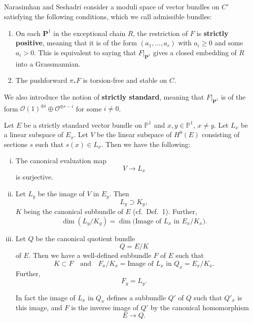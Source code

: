 \documentclass[12pt]{article}
\begin{document}
\subsection{}
Narasimhan and Seshadri consider a moduli space of vector bundles on $C'$ satisfying the following conditions, which we call admissible bundles:
\begin{enumerate}
    \item On each $\mathbf{P}^1$ in the exceptional chain $R$, the restriction of $F$ is \textbf{strictly positive}, meaning that it is of the form $(a_1,\ldots,a_r)$ with $a_i\geq 0$ and some $a_i>0$. This is equivalent to saying that $F|_{\mathbf{P}^1}$ gives a closed embedding of $R$ into a Grassmannian.
    \item The pushforward $\pi_*F$ is torsion-free and stable on $C$.
\end{enumerate}
We also introduce the notion of \textbf{strictly standard}, meaning that $F|_{\mathbf{P}^1}$ is of the form $\mathcal{O}(1)^{\oplus i}\oplus \mathcal{O}^{\oplus r-i}$ for some $i \neq 0$.

\begin{lemma}[NS Lemma 1]
Let $E$ be a strictly standard vector bundle on $\mathbb{P}^1$ and
$x,y \in \mathbb{P}^1$, $x \neq y$.
Let $L_x$ be a linear subspace of $E_x$.
Let $V$ be the linear subspace of $H^0(E)$ consisting of sections $s$ such that
$s(x) \in L_x$.
Then we have the following:
\begin{enumerate}[(i)]
\item
The canonical evaluation map
\[
V \longrightarrow L_x
\]
is surjective.

\item
Let $L_y$ be the image of $V$ in $E_y$.
Then
\[
L_y \supset K_y,
\]
$K$ being the canonical subbundle of $E$ (cf.~Def.~1).
Further,
\[
\dim(L_y/K_y)
=
\dim\bigl(\text{Image of }L_x\text{ in }E_x/K_x\bigr).
\]

\item
Let $Q$ be the canonical quotient bundle
\[
Q = E/K
\]
of $E$.
Then we have a well-defined subbundle $F$ of $E$ such that
\[
K \subset F
\quad\text{and}\quad
F_x/K_x = \text{Image of }L_x \text{ in } Q_x = E_x/K_x.
\]
Further,
\[
F_y = L_y.
\]

In fact the image of $L_x$ in $Q_x$ defines a subbundle $Q'$ of $Q$ such that
$Q'_x$ is this image, and $F$ is the inverse image of $Q'$ by the canonical
homomorphism
\[
E \to Q .
\]
\end{enumerate}
\end{lemma}
\end{document}
